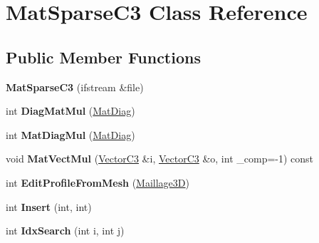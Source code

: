 \hypertarget{class_mat_sparse_c3}{}\section{Mat\+Sparse\+C3 Class Reference}
\label{class_mat_sparse_c3}
\subsection*{Public Member Functions}
\begin{DoxyCompactItemize}
\item 
{\bfseries Mat\+Sparse\+C3} (ifstream \&file)\hypertarget{class_mat_sparse_c3_a131b4ed2176c4133c07bb767238202e6}{}\label{class_mat_sparse_c3_a131b4ed2176c4133c07bb767238202e6}

\item 
int {\bfseries Diag\+Mat\+Mul} (\hyperlink{class_vector_c3}{Mat\+Diag})\hypertarget{class_mat_sparse_c3_a52f2549b2752a08a5bb5708f29aee6d1}{}\label{class_mat_sparse_c3_a52f2549b2752a08a5bb5708f29aee6d1}

\item 
int {\bfseries Mat\+Diag\+Mul} (\hyperlink{class_vector_c3}{Mat\+Diag})\hypertarget{class_mat_sparse_c3_aa378fe6d56a701a296fee6fe1f08d166}{}\label{class_mat_sparse_c3_aa378fe6d56a701a296fee6fe1f08d166}

\item 
void {\bfseries Mat\+Vect\+Mul} (\hyperlink{class_vector_c3}{Vector\+C3} \&i, \hyperlink{class_vector_c3}{Vector\+C3} \&o, int \+\_\+comp=-\/1) const \hypertarget{class_mat_sparse_c3_a646d02bcf55b7ee5b1259a291642c693}{}\label{class_mat_sparse_c3_a646d02bcf55b7ee5b1259a291642c693}

\item 
int {\bfseries Edit\+Profile\+From\+Mesh} (\hyperlink{class_maillage3_d}{Maillage3D})\hypertarget{class_mat_sparse_c3_a0e741ecd0918fd2a5353990386193a76}{}\label{class_mat_sparse_c3_a0e741ecd0918fd2a5353990386193a76}

\item 
int {\bfseries Insert} (int, int)\hypertarget{class_mat_sparse_c3_a14945b3885074a27b516796d597aadc8}{}\label{class_mat_sparse_c3_a14945b3885074a27b516796d597aadc8}

\item 
int {\bfseries Idx\+Search} (int i, int j)\hypertarget{class_mat_sparse_c3_a2e66f2ad85fdb75e9504935443eb2c3c}{}\label{class_mat_sparse_c3_a2e66f2ad85fdb75e9504935443eb2c3c}


\end{DoxyCompactItemize}
